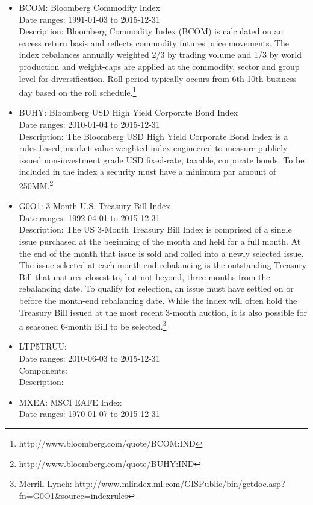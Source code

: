 \documentclass[12pt]{article}
\begin{document}
\begin{itemize}
\item BCOM: Bloomberg Commodity Index\\
Date ranges: 1991-01-03 to 2015-12-31\\
Description: Bloomberg Commodity Index (BCOM) is calculated on an excess return basis and reflects commodity futures price movements. The index rebalances annually weighted 2/3 by trading volume and 1/3 by world production and weight-caps are applied at the commodity, sector and group level for diversification. Roll period typically occurs from 6th-10th business day based on the roll schedule.\footnote{http://www.bloomberg.com/quote/BCOM:IND}
\item BUHY: Bloomberg USD High Yield Corporate Bond Index\\
Date ranges: 2010-01-04 to 2015-12-31 \\
Description: The Bloomberg USD High Yield Corporate Bond Index is a rules-based, market-value weighted index engineered to measure publicly issued non-investment grade USD fixed-rate, taxable, corporate bonds. To be included in the index a security must have a minimum par amount of 250MM.\footnote{http://www.bloomberg.com/quote/BUHY:IND}
\item G0O1: 3-Month U.S. Treasury Bill Index\\
Date ranges: 1992-04-01 to 2015-12-31 \\
Description: The US 3-Month Treasury Bill Index is comprised of a single issue purchased at the beginning of the
month and held for a full month. At the end of the month that issue is sold and rolled into a newly selected issue. The
issue selected at each month-end rebalancing is the outstanding Treasury Bill that matures closest to, but not beyond, three
months from the rebalancing date. To qualify for selection, an issue must have settled on or before the month-end
rebalancing date. While the index will often hold the Treasury Bill issued at the most recent 3-month auction, it is also
possible for a seasoned 6-month Bill to be selected.\footnote{Merrill Lynch: http://www.mlindex.ml.com/GISPublic/bin/getdoc.asp?fn=G0O1\&source=indexrules}
\item LTP5TRUU: \\
Date ranges: 2010-06-03 to 2015-12-31 \\
Components: \\
Description:
\item MXEA: MSCI EAFE Index \\
Date ranges: 1970-01-07 to 2015-12-31 \\

\end{itemize}
\end{document}
